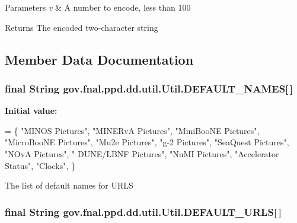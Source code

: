 \begin{DoxyParams}{Parameters}
{\em v} & A number to encode, less than 100 \\
\hline
\end{DoxyParams}
\begin{DoxyReturn}{Returns}
The encoded two-\/character string 
\end{DoxyReturn}


\subsection{Member Data Documentation}
\hypertarget{classgov_1_1fnal_1_1ppd_1_1dd_1_1util_1_1Util_a67984227db6d5fbc01c362aa1b3fb8ab}{
\subsubsection[{D\-E\-F\-A\-U\-L\-T\-\_\-\-N\-A\-M\-E\-S}]{\setlength{\rightskip}{0pt plus 5cm}final String gov.\-fnal.\-ppd.\-dd.\-util.\-Util.\-D\-E\-F\-A\-U\-L\-T\-\_\-\-N\-A\-M\-E\-S\mbox{[}$\,$\mbox{]}\hspace{0.3cm}{\ttfamily [static]}}}\label{classgov_1_1fnal_1_1ppd_1_1dd_1_1util_1_1Util_a67984227db6d5fbc01c362aa1b3fb8ab}
{\bfseries Initial value\-:}
\begin{DoxyCode}
= \{ \textcolor{stringliteral}{"MINOS Pictures"}, \textcolor{stringliteral}{"MINERvA Pictures"}, \textcolor{stringliteral}{"MiniBooNE Pictures"},
            \textcolor{stringliteral}{"MicroBooNE Pictures"}, \textcolor{stringliteral}{"Mu2e Pictures"}, \textcolor{stringliteral}{"g-2 Pictures"}, \textcolor{stringliteral}{"SeaQuest Pictures"}, \textcolor{stringliteral}{"NOvA Pictures"}, \textcolor{stringliteral}{"
      DUNE/LBNF Pictures"},
            \textcolor{stringliteral}{"NuMI Pictures"}, \textcolor{stringliteral}{"Accelerator Status"}, \textcolor{stringliteral}{"Clocks"}, \}
\end{DoxyCode}
The list of default names for U\-R\-L\-S \hypertarget{classgov_1_1fnal_1_1ppd_1_1dd_1_1util_1_1Util_a8e9b955b235eb7e3d1909af1fc9fffc0}{
\subsubsection[{D\-E\-F\-A\-U\-L\-T\-\_\-\-U\-R\-L\-S}]{\setlength{\rightskip}{0pt plus 5cm}final String gov.\-fnal.\-ppd.\-dd.\-util.\-Util.\-D\-E\-F\-A\-U\-L\-T\-\_\-\-U\-R\-L\-S\mbox{[}$\,$\mbox{]}\hspace{0.3cm}{\ttfamily [static]}}}\label{classgov_1_1fnal_1_1ppd_1_1dd_1_1util_1_1Util_a8e9b955b235eb7e3d1909af1fc9fffc0}

